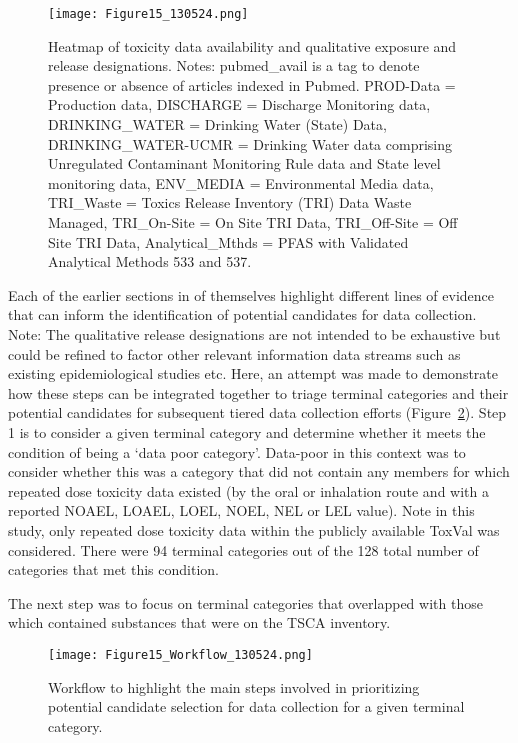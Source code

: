 \documentclass[
  super,
  preprint,
  3p]{elsarticle}
\begin{document}
\begin{figure}[H]

{\centering \texttt{[image: Figure15\_130524.png]}

}

\caption{\label{fig-hm-tscaact}Heatmap of toxicity data availability and
qualitative exposure and release designations. Notes: pubmed\_avail is a
tag to denote presence or absence of articles indexed in Pubmed.
PROD-Data = Production data, DISCHARGE = Discharge Monitoring data,
DRINKING\_WATER = Drinking Water (State) Data, DRINKING\_WATER-UCMR =
Drinking Water data comprising Unregulated Contaminant Monitoring Rule
data and State level monitoring data, ENV\_MEDIA = Environmental Media
data, TRI\_Waste = Toxics Release Inventory (TRI) Data Waste Managed,
TRI\_On-Site = On Site TRI Data, TRI\_Off-Site = Off Site TRI Data,
Analytical\_Mthds = PFAS with Validated Analytical Methods 533 and 537.}

\end{figure}

Each of the earlier sections in of themselves highlight different lines
of evidence that can inform the identification of potential candidates
for data collection. Note: The qualitative release designations are not
intended to be exhaustive but could be refined to factor other relevant
information data streams such as existing epidemiological studies etc.
Here, an attempt was made to demonstrate how these steps can be
integrated together to triage terminal categories and their potential
candidates for subsequent tiered data collection efforts
(Figure~\ref{fig-test-cand}). Step 1 is to consider a given terminal
category and determine whether it meets the condition of being a `data
poor category'. Data-poor in this context was to consider whether this
was a category that did not contain any members for which repeated dose
toxicity data existed (by the oral or inhalation route and with a
reported NOAEL, LOAEL, LOEL, NOEL, NEL or LEL value). Note in this
study, only repeated dose toxicity data within the publicly available
ToxVal was considered. There were 94 terminal categories out of the 128
total number of categories that met this condition.

The next step was to focus on terminal categories that overlapped with
those which contained substances that were on the TSCA inventory.

\begin{figure}

{\centering \texttt{[image: Figure15\_Workflow\_130524.png]}

}

\caption{\label{fig-test-cand}Workflow to highlight the main steps
involved in prioritizing potential candidate selection for data
collection for a given terminal category.}

\end{figure}
\end{document}
